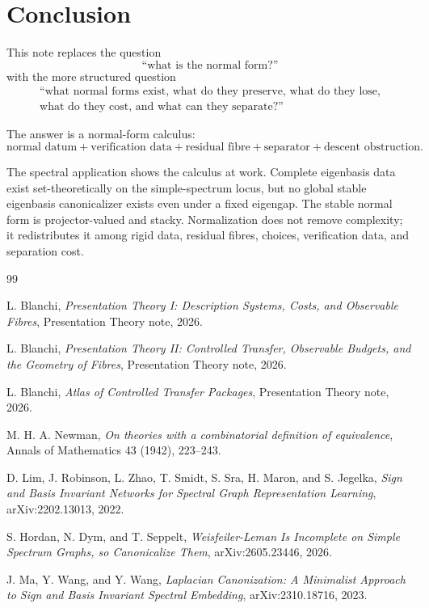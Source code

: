 \documentclass[11pt]{article}
\begin{document}
\section{Conclusion}

This note replaces the question
\[
\text{``what is the normal form?''}
\]
with the more structured question
\[
\begin{gathered}
\text{``what normal forms exist, what do they preserve, what do they lose,}\\
\text{what do they cost, and what can they separate?''}
\end{gathered}
\]

The answer is a normal-form calculus:
\[
\boxed{
\text{normal datum}
+
\text{verification data}
+
\text{residual fibre}
+
\text{separator}
+
\text{descent obstruction}.
}
\]

The spectral application shows the calculus at work. Complete eigenbasis data exist set-theoretically on the simple-spectrum locus, but no global stable eigenbasis canonicalizer exists even under a fixed eigengap. The stable normal form is projector-valued and stacky. Normalization does not remove complexity; it redistributes it among rigid data, residual fibres, choices, verification data, and separation cost.

\begin{thebibliography}{99}

L. Blanchi,
\emph{Presentation Theory I: Description Systems, Costs, and Observable Fibres},
Presentation Theory note, 2026.

L. Blanchi,
\emph{Presentation Theory II: Controlled Transfer, Observable Budgets, and the Geometry of Fibres},
Presentation Theory note, 2026.

L. Blanchi,
\emph{Atlas of Controlled Transfer Packages},
Presentation Theory note, 2026.

M. H. A. Newman,
\emph{On theories with a combinatorial definition of equivalence},
Annals of Mathematics 43 (1942), 223--243.

D. Lim, J. Robinson, L. Zhao, T. Smidt, S. Sra, H. Maron, and S. Jegelka,
\emph{Sign and Basis Invariant Networks for Spectral Graph Representation Learning},
arXiv:2202.13013, 2022.

S. Hordan, N. Dym, and T. Seppelt,
\emph{Weisfeiler-Leman Is Incomplete on Simple Spectrum Graphs, so Canonicalize Them},
arXiv:2605.23446, 2026.

J. Ma, Y. Wang, and Y. Wang,
\emph{Laplacian Canonization: A Minimalist Approach to Sign and Basis Invariant Spectral Embedding},
arXiv:2310.18716, 2023.

\end{thebibliography}
\end{document}

